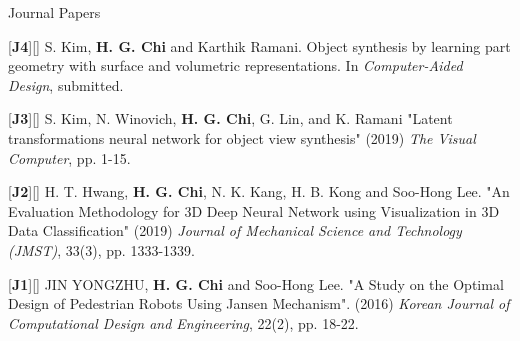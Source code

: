 


\begin{cventries}

\cvpub
{Journal Papers} %
{ %
\begin{cvitems}
\item {[\textbf{J4}][\href{https://docs.google.com/viewer?url=https://github.com/stnoah1/CV/raw/master/documents/CAD.pdf}{}] S. Kim, \textbf{H. G. Chi} and Karthik Ramani. Object synthesis by learning part geometry with surface and volumetric representations. In \textit{Computer-Aided Design}, submitted.}
\item {[\textbf{J3}][\href{https://link.springer.com/article/10.1007/s00371-019-01755-x}{}] S. Kim, N. Winovich, \textbf{H. G. Chi}, G. Lin, and K. Ramani "Latent transformations neural network for object view synthesis" (2019) \textit{The Visual Computer}, pp. 1-15.}
\item {[\textbf{J2}][\href{https://link.springer.com/content/pdf/10.1007/s12206-019-0233-1.pdf}{}] H. T. Hwang, \textbf{H. G. Chi}, N. K. Kang, H. B. Kong and Soo-Hong Lee. "An Evaluation Methodology for 3D Deep Neural Network using Visualization in 3D Data Classification" (2019) \textit{Journal of Mechanical Science and Technology (JMST)}, 33(3), pp. 1333-1339.}
\item {[\textbf{J1}][\href{https://docs.google.com/viewer?url=https://github.com/stnoah1/CV/raw/master/documents/Edison.pdf}{}] JIN YONGZHU, \textbf{H. G. Chi} and Soo-Hong Lee. "A Study on the Optimal Design of Pedestrian Robots Using Jansen Mechanism". (2016) \textit{Korean Journal of Computational Design and Engineering}, 22(2), pp. 18-22.}
\end{cvitems}
}



\end{cventries}
